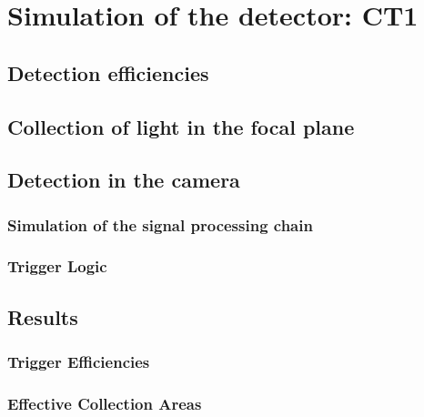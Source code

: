 

\chapter{Simulation of the detector: CT1}
\label{chapter:simct1}

\section{Detection efficiencies}

\section{Collection of light in the focal plane}

\section{Detection in the camera}

\subsection{Simulation of the signal processing chain}

\subsection{Trigger Logic}

\section{Results}

\subsection{Trigger Efficiencies}

\subsection{Effective Collection Areas}

